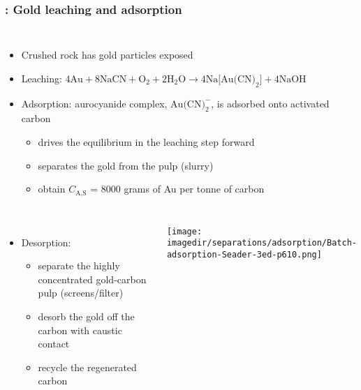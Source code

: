 \begin{frame}\frametitle{{\color{myOrange}{Example}}: Gold leaching and adsorption}
	\begin{columns}[c]
			\begin{itemize}
				\item	Crushed rock has gold particles exposed
				\item	Leaching: $4\text{Au} + 8\text{NaCN} + \text{O}_2 + 2 \text{H}_2\text{O} \longrightarrow  4 \text{Na[Au(CN)}_2\text{]} + 4 \text{NaOH}$
				\item	Adsorption: aurocyanide complex, $\text{Au(CN)}_2^{-}$, is adsorbed onto activated carbon
					\begin{itemize}
						\item	drives the equilibrium in the leaching step forward
						\item	separates the gold from the pulp (slurry)
						\item	obtain $C_\text{A,S}$ = 8000 grams of Au per tonne of carbon
					\end{itemize}
			\end{itemize}			
	\end{columns}
	\begin{columns}[t]
			\begin{itemize}
				\item	Desorption: 
					\begin{itemize}
						\item	separate the highly concentrated gold-carbon pulp (screens/filter)
						\item	desorb the gold off the carbon with caustic contact
						\item	recycle the regenerated carbon
					\end{itemize}
			\end{itemize}
			\begin{center}
				\texttt{[image: \\imagedir/separations/adsorption/Batch-adsorption-Seader-3ed-p610.png]}
			\end{center}
	\end{columns}		
\end{frame}

